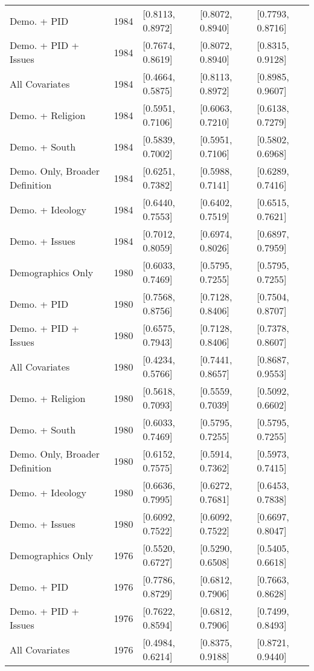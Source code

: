 \begin{longtable}{lrlll}
  Demo. + PID & 1984 & [0.8113, 0.8972] & [0.8072, 0.8940] & [0.7793, 0.8716] \\ 
  Demo. + PID + Issues & 1984 & [0.7674, 0.8619] & [0.8072, 0.8940] & [0.8315, 0.9128] \\ 
  All Covariates & 1984 & [0.4664, 0.5875] & [0.8113, 0.8972] & [0.8985, 0.9607] \\ 
  Demo. + Religion & 1984 & [0.5951, 0.7106] & [0.6063, 0.7210] & [0.6138, 0.7279] \\ 
  Demo. + South & 1984 & [0.5839, 0.7002] & [0.5951, 0.7106] & [0.5802, 0.6968] \\ 
  Demo. Only, Broader Definition & 1984 & [0.6251, 0.7382] & [0.5988, 0.7141] & [0.6289, 0.7416] \\ 
  Demo. + Ideology & 1984 & [0.6440, 0.7553] & [0.6402, 0.7519] & [0.6515, 0.7621] \\ 
  Demo. + Issues & 1984 & [0.7012, 0.8059] & [0.6974, 0.8026] & [0.6897, 0.7959] \\ 
  Demographics Only & 1980 & [0.6033, 0.7469] & [0.5795, 0.7255] & [0.5795, 0.7255] \\ 
  Demo. + PID & 1980 & [0.7568, 0.8756] & [0.7128, 0.8406] & [0.7504, 0.8707] \\ 
  Demo. + PID + Issues & 1980 & [0.6575, 0.7943] & [0.7128, 0.8406] & [0.7378, 0.8607] \\ 
  All Covariates & 1980 & [0.4234, 0.5766] & [0.7441, 0.8657] & [0.8687, 0.9553] \\ 
  Demo. + Religion & 1980 & [0.5618, 0.7093] & [0.5559, 0.7039] & [0.5092, 0.6602] \\ 
  Demo. + South & 1980 & [0.6033, 0.7469] & [0.5795, 0.7255] & [0.5795, 0.7255] \\ 
  Demo. Only, Broader Definition & 1980 & [0.6152, 0.7575] & [0.5914, 0.7362] & [0.5973, 0.7415] \\ 
  Demo. + Ideology & 1980 & [0.6636, 0.7995] & [0.6272, 0.7681] & [0.6453, 0.7838] \\ 
  Demo. + Issues & 1980 & [0.6092, 0.7522] & [0.6092, 0.7522] & [0.6697, 0.8047] \\ 
  Demographics Only & 1976 & [0.5520, 0.6727] & [0.5290, 0.6508] & [0.5405, 0.6618] \\ 
  Demo. + PID & 1976 & [0.7786, 0.8729] & [0.6812, 0.7906] & [0.7663, 0.8628] \\ 
  Demo. + PID + Issues & 1976 & [0.7622, 0.8594] & [0.6812, 0.7906] & [0.7499, 0.8493] \\ 
  All Covariates & 1976 & [0.4984, 0.6214] & [0.8375, 0.9188] & [0.8721, 0.9440] \\ 

\end{longtable}
